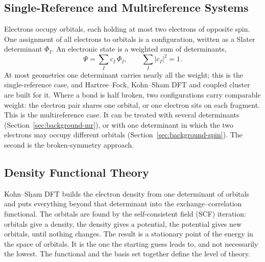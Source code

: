 \subsection{Single-Reference and Multireference Systems}
\label{sec:sr-vs-mr}

Electrons occupy orbitals, each holding at most two electrons of opposite
spin. One assignment of all electrons to orbitals is a configuration, written
as a Slater determinant $\Phi_I$. An electronic state is a weighted sum of
determinants,
%
\begin{equation}
  \Psi = \sum_I c_I \, \Phi_I ,
  \qquad \sum_I |c_I|^2 = 1 .
  \label{eq:ci-expansion}
\end{equation}
%
At most geometries one determinant carries nearly all the weight; this is the
single-reference case, and Hartree--Fock, Kohn--Sham DFT and coupled cluster
are built for it. Where a bond is half broken, two configurations carry
comparable weight: the electron pair shares one orbital, or one electron sits
on each fragment. This is the multireference case. It can be treated with
several determinants (Section~\ref{sec:background-mr}), or with one
determinant in which the two electrons may occupy different orbitals
(Section~\ref{sec:background-spin}). The second is the broken-symmetry
approach.

\subsection{Density Functional Theory}
\label{sec:background-dft}

Kohn--Sham DFT builds the electron density from one determinant of orbitals
and puts everything beyond that determinant into the exchange--correlation
functional. The orbitals are found by the self-consistent field (SCF)
iteration: orbitals give a density, the density gives a potential, the
potential gives new orbitals, until nothing changes. The result is a
stationary point of the energy in the space of orbitals. It is the one the
starting guess leads to, and not necessarily the lowest. The functional and
the basis set together define the level of theory.

